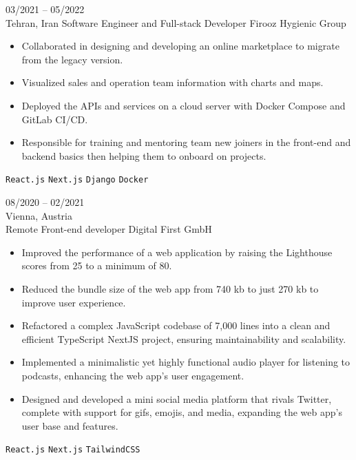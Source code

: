 \documentclass[9pt]{developercv} %
\begin{document}
\begin{entrylist}
        \entry
        {03/2021 -- 05/2022 \\ Tehran, Iran}
        {Software Engineer {\small and} Full-stack Developer}
        {Firooz Hygienic Group}
        {\vspace{-10pt}
            \begin{itemize}[noitemsep,topsep=0pt,parsep=0pt,partopsep=0pt, leftmargin=-1pt]
                \item Collaborated in designing and developing an online marketplace to migrate from the legacy version.
                \item Visualized sales and operation team information with charts and maps.
                \item Deployed the APIs and services on a cloud server with Docker Compose and GitLab CI/CD.
                \item Responsible for training and mentoring team new joiners in the front-end and backend basics then helping them to onboard on projects.
            \end{itemize}
            \texttt{React.js} \slashsep \texttt{Next.js} \slashsep \texttt{Django} \slashsep \texttt{Docker}
        }

        \entry
        {08/2020 -- 02/2021 \\ Vienna, Austria \\ Remote}
        {Front-end developer}
        {Digital First GmbH}
        {\vspace{-10pt}
            \begin{itemize}[noitemsep,topsep=0pt,parsep=0pt,partopsep=0pt, leftmargin=-1pt]
                \item Improved the performance of a web application by raising the Lighthouse scores from 25 to a minimum of 80.
                \item Reduced the bundle size of the web app from 740 kb to just 270 kb to improve user experience.
                \item Refactored a complex JavaScript codebase of 7,000 lines into a clean and efficient TypeScript NextJS project, ensuring maintainability and scalability.
                \item Implemented a minimalistic yet highly functional audio player for listening to podcasts, enhancing the web app's user engagement.
                \item Designed and developed a mini social media platform that rivals Twitter, complete with support for gifs, emojis, and media, expanding the web app's user base and features.
            \end{itemize}
            \texttt{React.js} \slashsep \texttt{Next.js} \slashsep \texttt{TailwindCSS}
        }


\end{entrylist}
\end{document}
